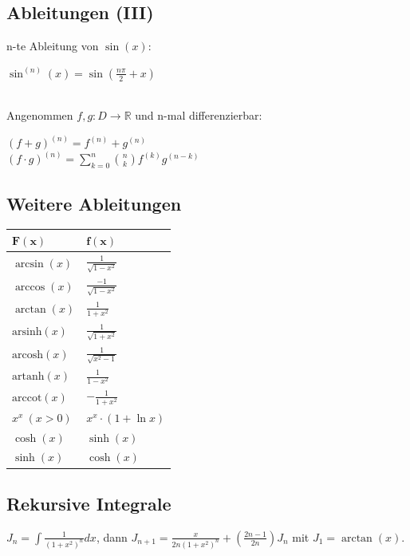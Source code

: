\documentclass[a4paper,10pt]{article}
\def\R{\mathbb{R}}
\begin{document}
\subsection{Ableitungen (III)}
n-te Ableitung von $\sin(x)$:
\begin{center}
  $\sin^{(n)}(x) = \sin(\frac{n\pi}{2} + x)$
\end{center}\\
Angenommen $f,g: D\to \R$ und n-mal differenzierbar:
\begin{center}
  $(f+g)^{(n)} = f^{(n)} + g^{(n)}$\\
  $(f\cdot g)^{(n)} = \sum\limits_{k=0}^{n}\binom{n}{k}f^{(k)}g^{(n-k)}$ 
\end{center}

\subsection{Weitere Ableitungen}
\begin{center}
  \begin{tabularx}{\linewidth}{>{\centering\arraybackslash}X>{\centering\arraybackslash}X}
  \toprule
  $\mathbf{F(x)}$ & $\mathbf{f(x)}$ \\
  \midrule
  $\arcsin(x)$ & $\frac{1}{\sqrt{1 - x^2}}$ \\
  $\arccos(x)$ & $\frac{-1}{\sqrt{1 - x^2}}$ \\
  $\arctan(x)$ & $\frac{1}{1 + x^2}$ \\ 
  $\text{arsinh}(x)$ & $\frac{1}{\sqrt{1 + x^2}}$ \\
  $\text{arcosh}(x)$ & $\frac{1}{\sqrt{x^2 - 1}}$ \\
  $\text{artanh}(x)$ & $\frac{1}{1 - x^2}$ \\
  $\text{arccot}(x)$ & $-\frac{1}{1 + x^2}$ \\
  $x^x \ (x > 0)$ & $x^x \cdot (1 + \ln x)$ \\
  $\cosh(x)$ & $\sinh(x)$ \\
  $\sinh(x)$ & $\cosh(x)$ \\
  \bottomrule
  \end{tabularx}
\end{center}

\subsection{Rekursive Integrale}

$J_n = \int \frac{1}{(1 + x^2)^n} dx$, dann $J_{n+1} = \frac{x}{2n(1 + x^2)^n} + (\frac{2n - 1}{2n})J_n$ mit $J_1 = \arctan(x)$.
\end{document}
